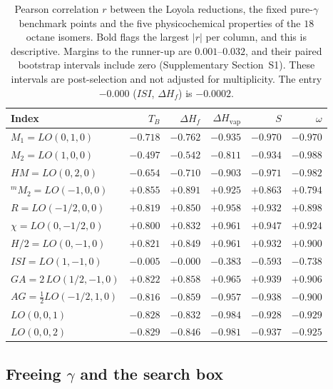 \begin{table}[htbp]
\centering
\caption{Pearson correlation $r$ between the Loyola reductions, the fixed pure-$\gamma$ benchmark points and the five physicochemical properties of the $18$ octane isomers. Bold flags the largest $|r|$ per column, and this is descriptive. Margins to the runner-up are $0.001$--$0.032$, and their paired bootstrap intervals include zero (Supplementary Section~S1). These intervals are post-selection and not adjusted for multiplicity. The entry $-0.000$ ($ISI$, $\Delta H_f$) is $-0.0002$.}
\label{tab:lo_octane}
\small
\begin{tabular}{lrrrrr}
\toprule
Index & $T_B$ & $\Delta H_f$ & $\Delta H_{\mathrm{vap}}$ & $S$ & $\omega$\\
\midrule
$M_1 = LO(0,1,0)$ & $-0.718$ & $-0.762$ & $-0.935$ & $-0.970$ & $-0.970$\\
$M_2 = LO(1,0,0)$ & $-0.497$ & $-0.542$ & $-0.811$ & $-0.934$ & $\mathbf{-0.988}$\\
$HM = LO(0,2,0)$ & $-0.654$ & $-0.710$ & $-0.903$ & $\mathbf{-0.971}$ & $-0.982$\\
${}^{m}\!M_2 = LO(-1,0,0)$ & $\mathbf{+0.855}$ & $\mathbf{+0.891}$ & $+0.925$ & $+0.863$ & $+0.794$\\
$R = LO(-1/2,0,0)$ & $+0.819$ & $+0.850$ & $+0.958$ & $+0.932$ & $+0.898$\\
$\chi = LO(0,-1/2,0)$ & $+0.800$ & $+0.832$ & $+0.961$ & $+0.947$ & $+0.924$\\
$H/2 = LO(0,-1,0)$ & $+0.821$ & $+0.849$ & $+0.961$ & $+0.932$ & $+0.900$\\
$ISI = LO(1,-1,0)$ & $-0.005$ & $-0.000$ & $-0.383$ & $-0.593$ & $-0.738$\\
$GA = 2\,LO(1/2,-1,0)$ & $+0.822$ & $+0.858$ & $+0.965$ & $+0.939$ & $+0.906$\\
$AG = \tfrac12 LO(-1/2,1,0)$ & $-0.816$ & $-0.859$ & $-0.957$ & $-0.938$ & $-0.900$\\
$LO(0,0,1)$ & $-0.828$ & $-0.832$ & $\mathbf{-0.984}$ & $-0.928$ & $-0.929$\\
$LO(0,0,2)$ & $-0.829$ & $-0.846$ & $-0.981$ & $-0.937$ & $-0.925$\\
\bottomrule
\end{tabular}
\end{table}

\subsection{Freeing $\gamma$ and the search box}\label{sec:ablation}

